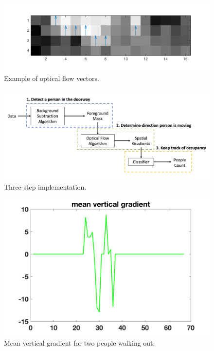 \documentclass[12pt,oneside]{article} %
\begin{document}
\begin{figure}[htb]
\centering
\includegraphics[scale=0.52]{images/quiver_gradients.png}
\caption{Example of optical flow vectors.}
\label{opflw}
\end{figure}

\begin{figure}[htb]
\centering
\includegraphics[scale=0.2]{images/threestep.png}
\caption{Three-step implementation.}
\label{threestep}
\end{figure}

\begin{figure}[htb]
\centering
\includegraphics[scale=0.52]{images/two_out.png}
\caption{Mean vertical gradient for two people walking out.}
\label{twoout}
\end{figure}
\end{document}

